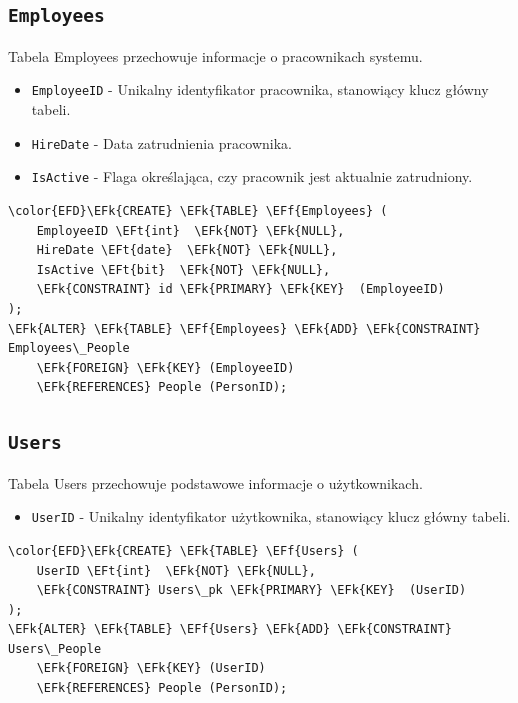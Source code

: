 \documentclass[11pt]{article}
\newcommand{\EFk}[1]{\textcolor{EFk}{\textbf{#1}}} %
\newcommand{\EFf}[1]{\textcolor{EFf}{#1}} %
\newcommand{\EFt}[1]{\textcolor{EFt}{\textbf{#1}}} %
\begin{document}
\subsection{\texttt{Employees}}
\label{sec:orge77d964}
Tabela Employees przechowuje informacje o pracownikach systemu.
\begin{itemize}
\item \texttt{EmployeeID} - Unikalny identyfikator pracownika, stanowiący klucz główny tabeli.
\item \texttt{HireDate} - Data zatrudnienia pracownika.
\item \texttt{IsActive} - Flaga określająca, czy pracownik jest aktualnie zatrudniony.
\end{itemize}
\begin{Code}
\begin{Verbatim}
\color{EFD}\EFk{CREATE} \EFk{TABLE} \EFf{Employees} (
    EmployeeID \EFt{int}  \EFk{NOT} \EFk{NULL},
    HireDate \EFt{date}  \EFk{NOT} \EFk{NULL},
    IsActive \EFt{bit}  \EFk{NOT} \EFk{NULL},
    \EFk{CONSTRAINT} id \EFk{PRIMARY} \EFk{KEY}  (EmployeeID)
);
\EFk{ALTER} \EFk{TABLE} \EFf{Employees} \EFk{ADD} \EFk{CONSTRAINT} Employees\_People
    \EFk{FOREIGN} \EFk{KEY} (EmployeeID)
    \EFk{REFERENCES} People (PersonID);
\end{Verbatim}
\end{Code}
\subsection{\texttt{Users}}
\label{sec:org00cc62a}
Tabela Users przechowuje podstawowe informacje o użytkownikach.
\begin{itemize}
\item \texttt{UserID} - Unikalny identyfikator użytkownika, stanowiący klucz główny tabeli.
\end{itemize}
\begin{Code}
\begin{Verbatim}
\color{EFD}\EFk{CREATE} \EFk{TABLE} \EFf{Users} (
    UserID \EFt{int}  \EFk{NOT} \EFk{NULL},
    \EFk{CONSTRAINT} Users\_pk \EFk{PRIMARY} \EFk{KEY}  (UserID)
);
\EFk{ALTER} \EFk{TABLE} \EFf{Users} \EFk{ADD} \EFk{CONSTRAINT} Users\_People
    \EFk{FOREIGN} \EFk{KEY} (UserID)
    \EFk{REFERENCES} People (PersonID);
\end{Verbatim}
\end{Code}
\end{document}
